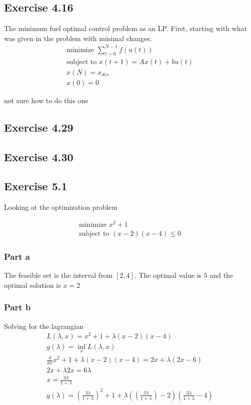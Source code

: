 \subsection{Exercise 4.16}
The minimum fuel optimal control problem as an LP. First, starting with what was given in the problem with minimal changes:
\begin{equation}
  \begin{aligned}
    \text{minimize } \sum_{t=0}^{N-1} f(u(t)) \\
    \text{subject to } x(t+1) = Ax(t) + bu(t) \\
    x(N) = x_{des} \\ 
    x(0) = 0
  \end{aligned}
\end{equation}

not sure how to do this one 



\subsection{Exercise 4.29}


\subsection{Exercise 4.30}

\subsection{Exercise 5.1}
Looking at the optimization problem

\begin{equation}
  \begin{aligned}
    \text{minimize } x^2 +1 \\
    \text{subject to } (x-2)(x-4) \leq 0
  \end{aligned}
\end{equation}
\subsubsection{Part a}
The feasible set is the interval from $[2,4]$. The optimal value is $5$ and the optimal solution is $x=2$ 

\subsubsection{Part b}
Solving for the lagrangian
\begin{equation}
  \begin{aligned}
    L(\lambda, x) = x^2+1 + \lambda (x-2)(x-4) \\
    g(\lambda) = \inf_x L(\lambda, x) \\
    \frac{d }{d x} x^2+1 + \lambda(x-2)(x-4) = 2x + \lambda(2x -6) \\
    2x + \lambda 2x = 6\lambda \\
    x = \frac{3\lambda}{1+\lambda} \\ 
    g(\lambda) = (\frac{3\lambda}{1+\lambda})^2 + 1 + \lambda( (\frac{3\lambda}{1+\lambda}) -2 )(\frac{3\lambda}{1+\lambda} -4)
  \end{aligned}
\end{equation}

